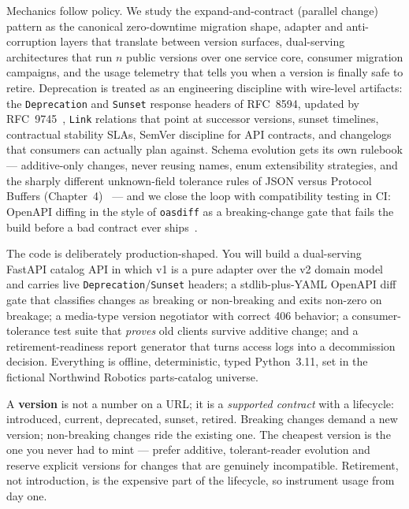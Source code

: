 Mechanics follow policy. We study the expand-and-contract (parallel change)
pattern as the canonical zero-downtime migration shape, adapter and
anti-corruption layers that translate between version surfaces, dual-serving
architectures that run $n$ public versions over one service core, consumer
migration campaigns, and the usage telemetry that tells you when a version is
finally safe to retire. Deprecation is treated as an engineering discipline
with wire-level artifacts: the \texttt{Deprecation} and \texttt{Sunset}
response headers of RFC~8594, updated by RFC~9745~\cite{rfc8594},
\texttt{Link} relations that point at successor versions, sunset timelines,
contractual stability SLAs, SemVer discipline for API contracts, and
changelogs that consumers can actually plan against. Schema evolution gets its
own rulebook --- additive-only changes, never reusing names, enum
extensibility strategies, and the sharply different unknown-field tolerance
rules of JSON versus Protocol Buffers (Chapter~4)~\cite{protobufdocs} --- and
we close the loop with compatibility testing in CI: OpenAPI diffing in the
style of \texttt{oasdiff} as a breaking-change gate that fails the build
before a bad contract ever ships~\cite{openapi31}.

The code is deliberately production-shaped. You will build a dual-serving
FastAPI catalog API in which v1 is a pure adapter over the v2 domain model and
carries live \texttt{Deprecation}/\texttt{Sunset} headers; a stdlib-plus-YAML
OpenAPI diff gate that classifies changes as breaking or non-breaking and
exits non-zero on breakage; a media-type version negotiator with correct 406
behavior; a consumer-tolerance test suite that \emph{proves} old clients
survive additive change; and a retirement-readiness report generator that
turns access logs into a decommission decision. Everything is offline,
deterministic, typed Python~3.11, set in the fictional Northwind Robotics
parts-catalog universe.

\begin{keyconceptbox}
A \textbf{version} is not a number on a URL; it is a \emph{supported contract}
with a lifecycle: introduced, current, deprecated, sunset, retired. Breaking
changes demand a new version; non-breaking changes ride the existing one. The
cheapest version is the one you never had to mint --- prefer additive,
tolerant-reader evolution and reserve explicit versions for changes that are
genuinely incompatible. Retirement, not introduction, is the expensive part of
the lifecycle, so instrument usage from day one.
\end{keyconceptbox}

